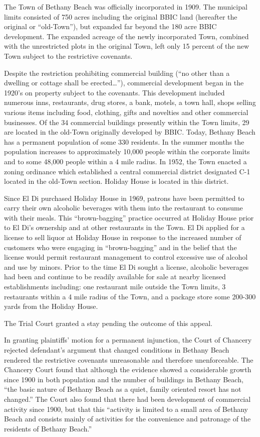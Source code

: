 The Town of Bethany Beach was officially incorporated in 1909. The municipal
limits consisted of 750 acres including the original BBIC land (hereafter the
original or ``old-Town''), but expanded far beyond the 180 acre BBIC
development. The expanded acreage of the newly incorporated Town, combined with
the unrestricted plots in the original Town, left only 15 percent of the new
Town subject to the restrictive covenants.

Despite the restriction prohibiting commercial building (``no other than a
dwelling or cottage shall be erected\ldots''), commercial development began in
the 1920's on property subject to the covenants. This development included
numerous inns, restaurants, drug stores, a bank, motels, a town hall, shops
selling various items including food, clothing, gifts and novelties and other
commercial businesses. Of the 34 commercial buildings presently within the Town
limits, 29 are located in the old-Town originally developed by BBIC. Today,
Bethany Beach has a permanent population of some 330 residents. In the summer
months the population increases to approximately 10,000 people within the
corporate limits and to some 48,000 people within a 4 mile radius. In 1952, the
Town enacted a zoning ordinance which established a central commercial district
designated C-1 located in the old-Town section. Holiday House is located in this
district.

Since El Di purchased Holiday House in 1969, patrons have been permitted to
carry their own alcoholic beverages with them into the restaurant to consume
with their meals. This ``brown-bagging'' practice occurred at Holiday House
prior to El Di's ownership and at other restaurants in the Town. El Di applied
for a license to sell liquor at Holiday House in response to the increased
number of customers who were engaging in ``brown-bagging'' and in the belief
that the license would permit restaurant management to control excessive use of
alcohol and use by minors. Prior to the time El Di sought a license, alcoholic
beverages had been and continue to be readily available for sale at nearby
licensed establishments including: one restaurant {\textonehalf} mile outside
the Town limits, 3 restaurants within a 4 mile radius of the Town, and a package
store some 200-300 yards from the Holiday House.

The Trial Court granted a stay pending the outcome of this appeal.


In granting plaintiffs' motion for a permanent injunction, the Court of Chancery
rejected defendant's argument that changed conditions in Bethany Beach rendered
the restrictive covenants unreasonable and therefore unenforceable. The Chancery
Court found that although the evidence showed a considerable growth since 1900
in both population and the number of buildings in Bethany Beach, ``the basic
nature of Bethany Beach as a quiet, family oriented resort has not changed.''
The Court also found that there had been development of commercial activity
since 1900, but that this ``activity is limited to a small area of Bethany Beach
and consists mainly of activities for the convenience and patronage of the
residents of Bethany Beach.''

